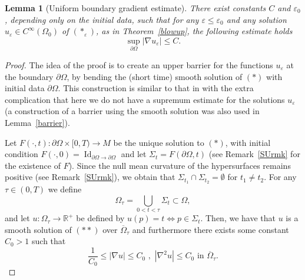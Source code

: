 \documentclass[11pt]{amsart}
\newtheorem{Lemma}[Theorem]{Lemma}
\renewcommand{\epsilon}{\varepsilon}
\DeclareMathOperator{\Id}{Id}
\def\R{\mathbb{R}}
\def\e{\epsilon}
\def\t{\tau}
\def\ov{\overline}
\begin{document}
\begin{Lemma}[Uniform boundary gradient estimate]\label{bdrygradest}
There exist constants $C$ and $\e_0$,  depending only on the initial data,  such that for any $\e\le\e_0$ and any solution $u_\e\in C^\infty(\Omega_0)$ of $(*_{\varepsilon})$, as  in  Theorem~\ref{blowup}, the following estimate holds
\[\sup_{\partial\Omega}|\nabla u_{\varepsilon}|\le C.\]
\end{Lemma}
\begin{proof} The idea of the proof is to create an upper barrier for the functions $u_\e$ at the boundary $\partial\Omega$, by bending the (short time) smooth solution of $(*)$ with initial data $\partial \Omega$. This construction is similar to that in \cite[Lemma 4.2]{S08} with the extra complication that here we do not have a supremum estimate for the solutions $u_\e$ (a construction of a barrier using the smooth solution  was also used  in Lemma~\ref{barrier}). 

Let $F(\cdot,t):\partial\Omega\times[0,T)\to M$ be the unique solution to $(*)$, with initial condition $F(\cdot, 0)=\Id_{\partial\Omega\to\partial\Omega}$ and let $\Sigma_t=F(\partial\Omega, t)$ (see Remark~\ref{SUrmk} for the existence of $F$). Since the null mean curvature of the hypersurfaces remains positive (see Remark~\ref{SUrmk}), we obtain that $\Sigma _{t_1}\cap \Sigma_{t_2}=\emptyset$ for $t_1\ne t_2$. For any $\t\in (0, T)$ we define
\[
\Omega_\t=\bigcup_{0<t<\t}\Sigma_t\subset \Omega,
\]
and let $u:\Omega_\t\to \R^+$ be defined by $u(p)=t\Leftrightarrow p\in \Sigma_t$. Then, we have that $u$ is a smooth solution of $(**)$ over $\ov\Omega_\t$ and furthermore there exists some constant $C_0>1$ such that
\begin{equation}\label{Du}
\frac{1}{C_0}\le |\nabla u|\le C_0\,\,,\,\,|\nabla^2 u|\le C_0\text{    in   }\ov \Omega_\t.
\end{equation}


\end{proof}
\end{document}
